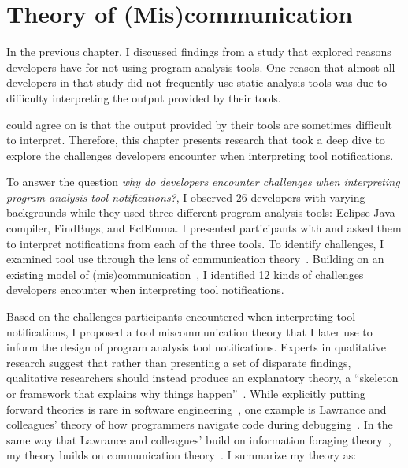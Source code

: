 \chapter{Theory of (Mis)communication}
\label{chap:theory}

In the previous chapter, I discussed findings from a study that explored reasons developers have for not using program analysis tools. One reason that almost all developers in that study did not frequently use static analysis tools was due to difficulty interpreting the output provided by their tools.

 could agree on is that the output provided by their tools are sometimes difficult to interpret.
Therefore, this chapter presents research that took a deep dive to explore the challenges developers encounter when interpreting tool notifications.

To answer the question \emph{why do developers encounter challenges when interpreting program analysis tool notifications?}, I observed 26 developers with varying backgrounds while they used three different program analysis tools: Eclipse Java compiler, FindBugs, and EclEmma. I presented participants with and asked them to interpret notifications from each of the three tools. 
To identify challenges, I examined tool use through the lens of communication theory~\cite{bowman1987modeling}.
Building on an existing model of (mis)communication~\cite{mustajoki2008modelling}, I identified 12 kinds of challenges developers encounter when interpreting tool notifications.

Based on the challenges participants encountered when interpreting tool notifications, I proposed a tool miscommunication theory that I later use to inform the design of program analysis tool notifications.
Experts in qualitative research suggest that rather than presenting a set of disparate findings, qualitative researchers should instead produce an explanatory theory, a ``skeleton or framework that explains why things happen''~\cite{corbin2014basics}. While explicitly putting forward theories is rare in software engineering~\cite{hannay2007systematic}, one example is Lawrance and colleagues' theory of how programmers navigate code during debugging~\cite{lawrance2013programmers}. In the same way that Lawrance and colleagues' build on 
information foraging theory~\cite{pirolli1999information}, my theory builds on communication theory~\cite{bowman1987modeling}.
I summarize my theory as:

